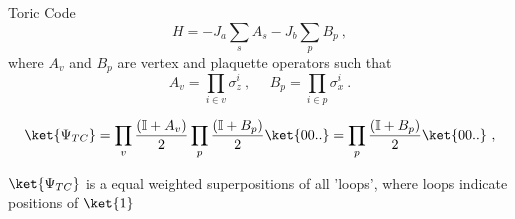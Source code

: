 \begin{frame}{Toric Code}
$$
H = -J_a \sum_s A_s - J_b \sum_p B_p \ , 
$$
where $A_v$ and $B_p$ are vertex and plaquette operators such that 
$$
A_v = \prod_{i \in v} \sigma_z^i   \ , \ \ \ \ \ \  B_p = \prod_{i \in p} \sigma_x^{i} \ . 
$$

$$
\ket{\Psi_{TC}} =  \prod_{v} \frac{\left( \mathbb{I} + A_v\right)}{2} \prod_{p} \frac{\left( \mathbb{I} + B_p\right)}{2}\ket{00..} =  \prod_{p} \frac{\left( \mathbb{I} + B_p \right)}{2} \ket{00..} \ ,
$$

$\ket{\Psi_{TC}}$ is a equal weighted superpositions of all 'loops', where loops indicate positions of $\ket{1}$
\end{frame}